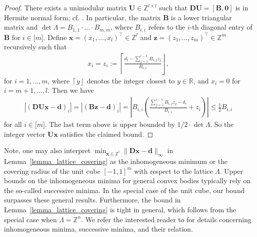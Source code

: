 \documentclass[pdflatex]{sn-jnl}
\newcommand{\R}{\mathbb{R}}
\newcommand{\Z}{\mathbb{Z}}
\newcommand{\bx}{\bm{x}}
\newcommand{\bd}{\bm{d}}
\newcommand{\bz}{\bm{z}}
\newcommand{\bB}{\bm{B}}
\newcommand{\bD}{\bm{D}}
\newcommand{\bU}{\bm{U}}
\theoremstyle{thmstyleone}%
\theoremstyle{thmstyletwo}%
\theoremstyle{thmstylethree}%
\begin{document}
	\begin{proof}
		There exists a unimodular matrix $\bU\in\Z^{l\times l}$ such that $\bD\bU= [\bB, \bm{0}]$ is in Hermite normal form; cf.  \cite[Chapter 4]{schrijvertheorylinint86}.
		In particular, the matrix $\bB$ is a lower triangular matrix and $\det\Lambda=B_{1,1}\cdot\ldots\cdot B_{m,m}$, where $B_{i,i}$ refers to the $i$-th diagonal entry of $\bB$ for $i\in\lbrack m\rbrack$. 
		Define $\bx = (x_1,\ldots,x_l)^\top\in\Z^l$ and $\bz = (z_1,\ldots,z_m)^\top\in\Z^m$ recursively such that  
		\begin{align*}
			x_i = z_i := \left\lceil \frac{d_i-\sum_{j=1}^{i-1}B_{i,j}z_j}{B_{i,i}}\right\rfloor,
		\end{align*}
		for $i=1,\ldots,m$,
		where $\left\lceil y\right\rfloor$ denotes the integer closest to $y\in\R$, and $x_i=0$ for $i=m+1,\ldots,l$.
		Then we have
		\begin{align*}
			\left|(\bD\bU\bx - \bd)_i\right| = \left|(\bB\bz - \bd)_i\right| 
			= \left| B_{i,i}\left(\frac{ \sum_{j=1}^{i-1} B_{i,j}z_j -d_i}{B_{i,i}} + z_i\right)\right| \leq \tfrac{1}{2}B_{i,i}
		\end{align*}
		for all $i\in\lbrack m\rbrack$. The last term above is upper bounded by $1/2\cdot\det\Lambda$. So the integer vector $\bU\bx$ satisfies the claimed bound.
	\end{proof}
	Note, one may also interpret $\min_{\bx\in \Z^l}\|\bD\bx-\bd\|_\infty$ in Lemma~\ref{lemma_lattice_covering}  as the inhomogeneous minimum or the covering radius of the unit cube $[-1,1]^m$ with respect to the lattice $\Lambda$. Upper bounds on the inhomogeneous minima for general convex bodies typically rely on the so-called successive minima. In the special case of the unit cube, our bound surpasses these general results. Furthermore, the bound in Lemma~\ref{lemma_lattice_covering} is tight in general, which follows from the special case when $\Lambda = \Z^n$. 
	We refer the interested reader to \cite[Chapter 2, Section 13]{lekkerkerker2014geometry} for details concerning inhomogeneous minima, successive minima, and their relation.
\end{document}
